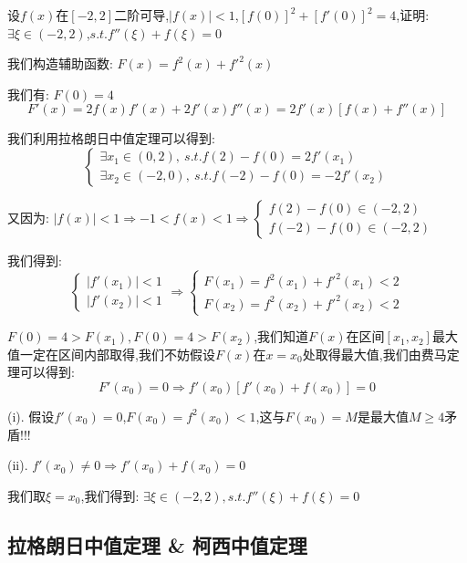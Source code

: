 \begin{proposition}
	设$f(x)$在$[-2,2]$二阶可导,$|f(x)|<1$,$[f(0)]^2+[f'(0)]^2=4$,证明: $\exists \xi\in(-2,2)$,$s.t. f''(\xi)+f(\xi)=0$
\end{proposition}
\begin{solution}

	我们构造辅助函数: $F(x)=f^{2}(x)+f'^{2}(x)$

	我们有: $F(0)=4$
	$$F'(x)=2f(x)f'(x)+2f'(x)f''(x)=2f'(x)[f(x)+f''(x)]$$

	我们利用拉格朗日中值定理可以得到:
	$$\left\lbrace
		\begin{array}{l}
			\exists x_{1}\in(0,2),\ s.t. f(2)-f(0)=2f'(x_{1}) \\
			\exists x_{2}\in(-2,0),\ s.t. f(-2)-f(0)=-2f'(x_{2})
		\end{array}
		\right. $$

	又因为: $|f(x)|<1\Rightarrow -1<f(x)<1\Rightarrow \left\lbrace
		\begin{array}{l}
			f(2)-f(0)\in(-2,2) \\
			f(-2)-f(0)\in(-2,2)
		\end{array}
		\right. $

	我们得到:
	$$\left\lbrace
		\begin{array}{l}
			|f'(x_{1})|<1 \\
			|f'(x_{2})|<1
		\end{array}
		\right. \Rightarrow \left\lbrace
		\begin{array}{l}
			F(x_{1})=f^{2}(x_{1})+f'^{2}(x_{1})<2 \\
			F(x_{2})=f^{2}(x_{2})+f'^{2}(x_{2})<2
		\end{array}
		\right. $$

	$F(0)=4>F(x_{1}),F(0)=4>F(x_{2})$,我们知道$F(x)$在区间$[x_{1},x_{2}]$最大值一定在区间内部取得,我们不妨假设$F(x)$在$x=x_{0}$处取得最大值,我们由费马定理可以得到:
	$$F'(x_{0})=0\Rightarrow f'(x_{0})[f'(x_{0})+f(x_{0})]=0$$

	(i). 假设$f'(x_{0})=0$,$F(x_{0})=f^{2}(x_{0})<1$,这与$F(x_{0})=M$是最大值$M\geq 4$矛盾!!!

	(ii). $f'(x_{0})\neq 0\Rightarrow f'(x_{0})+f(x_{0})=0$

	我们取$\xi=x_{0}$,我们得到: $\exists \xi\in(-2,2),s.t. f''(\xi)+f(\xi)=0$

\end{solution}


\subsection{拉格朗日中值定理 \& 柯西中值定理}

